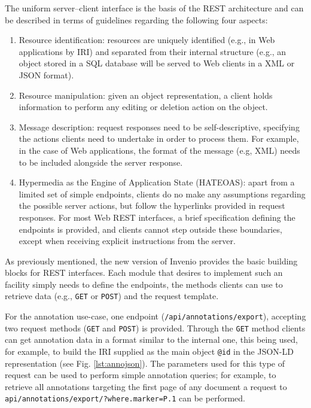 The uniform server--client interface is the basis of the REST architecture and
can be described in terms of guidelines regarding the following four aspects:
\begin{enumerate}
  \item Resource identification: resources are uniquely identified (e.g., in Web
                                 applications by IRI) and separated from their
                                 internal structure (e.g., an object stored in a
                                 SQL database will be served to Web clients in a
                                 XML or JSON format).
  \item Resource manipulation: given an object representation, a client holds
                              information to perform any editing or deletion
                              action on the object.
  \item Message description: request responses need to be self-descriptive,
                             specifying the actions clients need to undertake in
                             order to process them. For example, in the case of
                             Web applications, the format of the message (e.g,
                             XML) needs to be included alongside the server
                             response.
  \item Hypermedia as the Engine of Application State (HATEOAS): apart from a
              limited set of simple endpoints, clients do no make any
              assumptions regarding the possible server actions, but follow
              the hyperlinks provided in request responses. For most Web REST
              interfaces, a brief specification defining the endpoints is
              provided, and clients cannot step outside these boundaries,
              except when receiving explicit instructions from the server.
\end{enumerate}

As previously mentioned, the new version of Invenio provides the basic building
blocks for REST interfaces. Each module that desires to implement such an
facility simply needs to define the endpoints, the methods clients can use to
retrieve data (e.g., \texttt{GET} or \texttt{POST}) and the request template.

For the annotation use-case, one endpoint (\texttt{/api/annotations/export}),
accepting two request methods (\texttt{GET} and \texttt{POST}) is provided.
Through the \texttt{GET} method clients can get annotation data in a format
similar to the internal one, this being used, for example, to build the IRI
supplied as the main object \texttt{@id} in the JSON-LD representation (see
Fig. \ref{lst:annojson}). The parameters used for this type of request can be
used to perform simple annotation queries; for example, to retrieve all
annotations targeting the first page of any document a request to
\texttt{api/annotations/export/?where.marker=P.1} can be performed.

